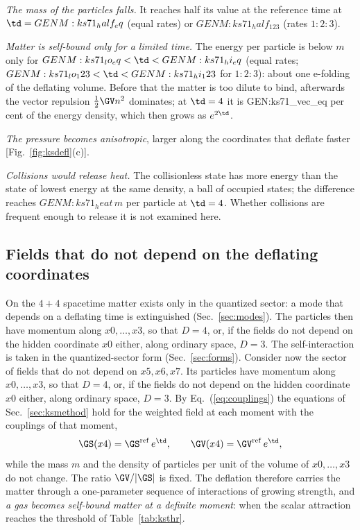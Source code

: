\emph{The mass of the particles falls.} It reaches half its value at the reference time at
$\td={{GENM:ks71_half_eq}}$ (equal rates) or ${{GENM:ks71_half_123}}$ (rates $1:2:3$).

\emph{Matter is self-bound only for a limited time.} The energy per particle is below $m$ only for
${{GENM:ks71_lo_eq}}<\td<{{GENM:ks71_hi_eq}}$ (equal rates;
${{GENM:ks71_lo_123}}<\td<{{GENM:ks71_hi_123}}$ for $1:2:3$): about one e-folding of the deflating
volume. Before that the matter is too dilute to bind, afterwards the vector repulsion
$\tfrac12\GV n^{2}$ dominates; at $\td=4$ it is {{GEN:ks71_vec_eq}} per cent of the energy density,
which then grows as $e^{2\td}$.

\emph{The pressure becomes anisotropic}, larger along the coordinates that deflate faster
[Fig.~\ref{fig:ksdefl}(c)].

\emph{Collisions would release heat.} The collisionless state has more energy than the state of
lowest energy at the same density, a ball of occupied states; the difference reaches
${{GENM:ks71_heat}}\,m$ per particle at $\td=4$. Whether collisions are frequent enough to release it
is not examined here.

\subsection{Fields that do not depend on the deflating coordinates}
\label{sec:ksreduced}

On the $4+4$ spacetime matter exists only in the quantized sector: a mode that depends on a
deflating time is extinguished (Sec.~\ref{sec:modes}). The particles then have momentum along
$x0,\dots,x3$, so that $D=4$, or, if the fields do not depend on the hidden coordinate $x0$ either,
along ordinary space, $D=3$. The self-interaction is taken in the quantized-sector form
(Sec.~\ref{sec:forms}).
Consider now the sector of fields that do not depend on $x5,x6,x7$. Its particles have momentum
along $x0,\dots,x3$, so that $D=4$, or, if the fields do not depend on the hidden coordinate $x0$
either, along ordinary space, $D=3$.
By Eq.~(\ref{eq:couplings}) the equations of Sec.~\ref{sec:ksmethod} hold for the weighted field at
each moment with the couplings of that moment,
\begin{equation}
\GS(x4)=\GS^{\mathrm{ref}}\,e^{\td},\qquad\GV(x4)=\GV^{\mathrm{ref}}\,e^{\td},
\end{equation}
while the mass $m$ and the density of particles per unit of the volume of $x0,\dots,x3$ do not
change. The ratio $\GV/|\GS|$ is fixed. The deflation therefore carries the matter through a
one-parameter sequence of interactions of growing strength, and \emph{a gas becomes self-bound
matter at a definite moment}: when the scalar attraction reaches the threshold of
Table~\ref{tab:ksthr}.

